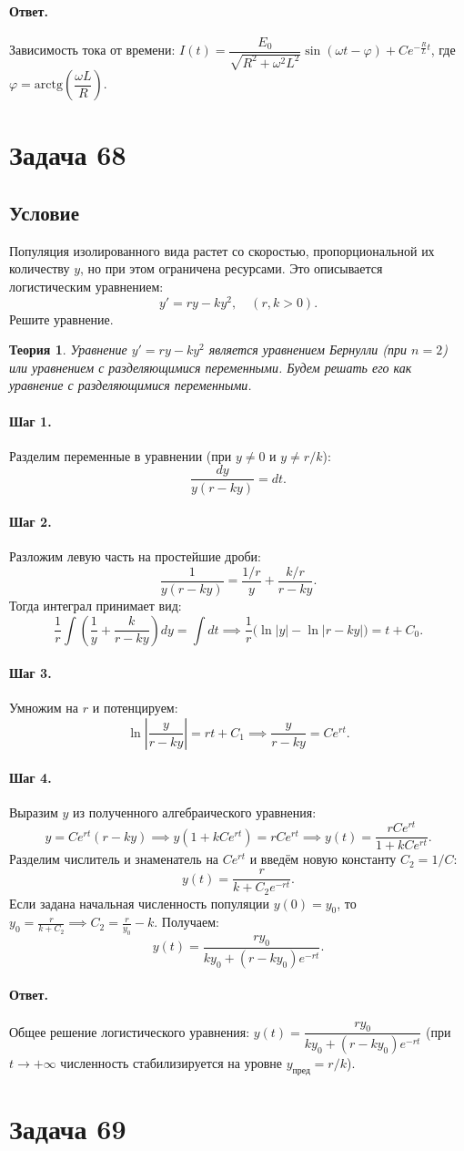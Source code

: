 \documentclass[12pt,a4paper]{article}
\theoremstyle{solution}
\newtheorem*{theory}{Теория}
\newcommand{\task}[1]{\newpage\section*{Задача #1}}
\newcommand{\answer}{\paragraph{Ответ.}}
\newcommand{\step}[1]{\paragraph{Шаг #1.}}
\begin{document}
\answer
Зависимость тока от времени: $I(t) = \dfrac{E_0}{\sqrt{R^2 + \omega^2 L^2}} \sin(\omega t - \varphi) + C e^{-\frac{R}{L}t}$, где $\varphi = \mathrm{arctg}\left(\dfrac{\omega L}{R}\right)$.

\task{68}
\subsection*{Условие}
Популяция изолированного вида растет со скоростью, пропорциональной их количеству $y$, но при этом ограничена ресурсами. Это описывается логистическим уравнением:
\[
y' = ry - ky^2, \quad (r, k > 0).
\]
Решите уравнение.

\begin{theory}
Уравнение $y' = ry - ky^2$ является уравнением Бернулли (при $n=2$) или уравнением с разделяющимися переменными. Будем решать его как уравнение с разделяющимися переменными.
\end{theory}

\step{1} Разделим переменные в уравнении (при $y \neq 0$ и $y \neq r/k$):
\[
\frac{dy}{y(r - ky)} = dt.
\]

\step{2} Разложим левую часть на простейшие дроби:
\[
\frac{1}{y(r - ky)} = \frac{1/r}{y} + \frac{k/r}{r - ky}.
\]
Тогда интеграл принимает вид:
\[
\frac{1}{r} \int \left( \frac{1}{y} + \frac{k}{r - ky} \right) dy = \int dt \implies \frac{1}{r} \Big( \ln|y| - \ln|r - ky| \Big) = t + C_0.
\]

\step{3} Умножим на $r$ и потенцируем:
\[
\ln\left| \frac{y}{r - ky} \right| = rt + C_1 \implies \frac{y}{r - ky} = C e^{rt}.
\]

\step{4} Выразим $y$ из полученного алгебраического уравнения:
\[
y = C e^{rt} (r - ky) \implies y(1 + k C e^{rt}) = r C e^{rt} \implies y(t) = \frac{r C e^{rt}}{1 + k C e^{rt}}.
\]
Разделим числитель и знаменатель на $C e^{rt}$ и введём новую константу $C_2 = 1/C$:
\[
y(t) = \frac{r}{k + C_2 e^{-rt}}.
\]
Если задана начальная численность популяции $y(0) = y_0$, то $y_0 = \frac{r}{k+C_2} \implies C_2 = \frac{r}{y_0} - k$. Получаем:
\[
y(t) = \frac{r y_0}{k y_0 + (r - k y_0)e^{-rt}}.
\]

\answer
Общее решение логистического уравнения: $y(t) = \dfrac{r y_0}{k y_0 + (r - k y_0)e^{-rt}}$ (при $t \to +\infty$ численность стабилизируется на уровне $y_{\text{пред}} = r/k$).

\task{69}
\end{document}
